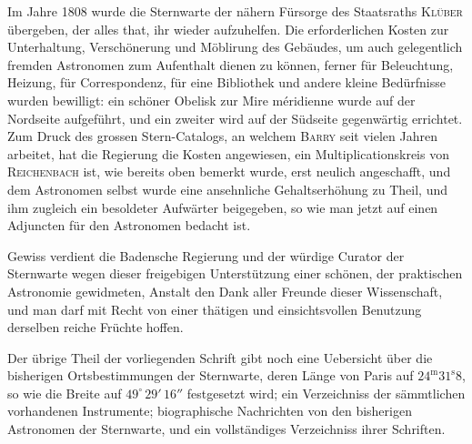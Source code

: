 Im Jahre 1808 wurde die Sternwarte der nähern Fürsorge des Staatsraths \textsc{Klüber} übergeben, der alles that, ihr wieder aufzuhelfen. Die erforderlichen Kosten zur Unterhaltung, Verschönerung und Möblirung des Gebäudes, um auch gelegentlich fremden Astronomen zum Aufenthalt dienen zu können, ferner für Beleuchtung, Heizung, für Correspondenz, für eine Bibliothek und andere kleine Bedürfnisse wurden bewilligt: ein schöner Obelisk zur Mire méridienne wurde auf der Nordseite aufgeführt, und ein zweiter wird auf der Südseite gegenwärtig errichtet. Zum Druck des grossen Stern-Catalogs, an welchem \textsc{Barry} seit vielen Jahren arbeitet, hat die Regierung die Kosten angewiesen, ein Multiplicationskreis von \textsc{Reichenbach} ist, wie bereits oben bemerkt wurde, erst neulich angeschafft, und dem Astronomen selbst wurde eine ansehnliche Gehaltserhöhung zu Theil, und ihm zugleich ein besoldeter Aufwärter beigegeben, so wie man jetzt auf einen Adjuncten für den Astronomen bedacht ist.

Gewiss verdient die Badensche Regierung und der würdige Curator der Sternwarte wegen dieser freigebigen Unterstützung einer schönen, der praktischen Astronomie gewidmeten, Anstalt den Dank aller Freunde dieser Wissenschaft, und man darf mit Recht von einer thätigen und einsichtsvollen Benutzung derselben reiche Früchte hoffen.

Der übrige Theil der vorliegenden Schrift gibt noch eine Uebersicht über die bisherigen Ortsbestimmungen der Sternwarte, deren Länge von Paris auf $24^{\mathrm m}31^{\mathrm s}8$, so wie die Breite auf $49^\circ\,29'\,16''$ festgesetzt wird; ein Verzeichniss der sämmtlichen vorhandenen Instrumente; biographische Nachrichten von den bisherigen Astronomen der Sternwarte, und ein vollständiges Verzeichniss ihrer Schriften.
